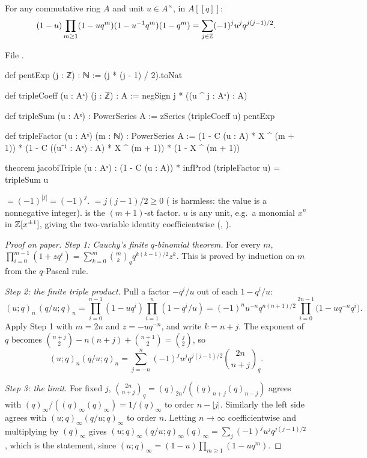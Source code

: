 \begin{theorem}\label{l25:thm:jtp}
For any commutative ring $A$ and unit $u\in A^\times$, in $A[[q]]$:
\begin{equation*}
(1-u)\prod_{m\ge1}(1-uq^m)(1-u^{-1}q^m)(1-q^m)=\sum_{j\in{\mathbb{Z}}}(-1)^ju^jq^{j(j-1)/2}.
\end{equation*}
\end{theorem}
\noindent File .
\begin{leancode}
def pentExp (j : ℤ) : ℕ := (j * (j - 1) / 2).toNat

def tripleCoeff (u : Aˣ) (j : ℤ) : A := negSign j * ((u ^ j : Aˣ) : A)

def tripleSum (u : Aˣ) : PowerSeries A := zSeries (tripleCoeff u) pentExp

def tripleFactor (u : Aˣ) (m : ℕ) : PowerSeries A :=
  (1 - C (u : A) * X ^ (m + 1)) * (1 - C ((u⁻¹ : Aˣ) : A) * X ^ (m + 1)) * (1 - X ^ (m + 1))

theorem jacobiTriple (u : Aˣ) :
    (1 - C (u : A)) * infProd (tripleFactor u) = tripleSum u
\end{leancode}
\begin{dictionary}
 $=(-1)^{|j|}=(-1)^j$.  $=j(j-1)/2\ge0$ ( is harmless: the value is
a nonnegative integer).  is the $(m+1)$-st factor. $u$ is any unit, e.g.\ a monomial
$x^n$ in ${\mathbb{Z}}[x^{\pm1}]$, giving the two-variable identity coefficientwise (,
).
\end{dictionary}
\begin{proof}[Proof on paper]
\emph{Step 1: Cauchy's finite $q$-binomial theorem.} For every $m$,
$\prod_{i=0}^{m-1}(1+zq^i)=\sum_{k=0}^m\binom mk_qq^{k(k-1)/2}z^k$. This is proved by induction on $m$ from the
$q$-Pascal rule.

\emph{Step 2: the finite triple product.} Pull a factor $-q^i/u$ out of each $1-q^i/u$:
\begin{equation*}
(u;q)_n\,(q/u;q)_n=\prod_{i=0}^{n-1}(1-uq^i)\prod_{i=1}^{n}(1-q^i/u)
=(-1)^nu^{-n}q^{n(n+1)/2}\prod_{i=0}^{2n-1}\big(1-uq^{-n}q^{i}\big).
\end{equation*}
Apply Step 1 with $m=2n$ and $z=-uq^{-n}$, and write $k=n+j$. The exponent of $q$ becomes
$\binom{n+j}{2}-n(n+j)+\binom{n+1}{2}=\binom j2$, so
\begin{equation*}
(u;q)_n(q/u;q)_n=\sum_{j=-n}^{n}(-1)^ju^jq^{j(j-1)/2}\binom{2n}{n+j}_q .
\end{equation*}

\emph{Step 3: the limit.} For fixed $j$, $\binom{2n}{n+j}_q=(q)_{2n}/((q)_{n+j}(q)_{n-j})$ agrees with
$(q)_\infty/((q)_\infty(q)_\infty)=1/(q)_\infty$ to order $n-|j|$. Similarly the left side agrees with
$(u;q)_\infty(q/u;q)_\infty$ to order $n$. Letting $n\to\infty$ coefficientwise and multiplying by $(q)_\infty$ gives
$(u;q)_\infty(q/u;q)_\infty(q)_\infty=\sum_j(-1)^ju^jq^{j(j-1)/2}$, which is the statement, since
$(u;q)_\infty=(1-u)\prod_{m\ge1}(1-uq^m)$.
\end{proof}
